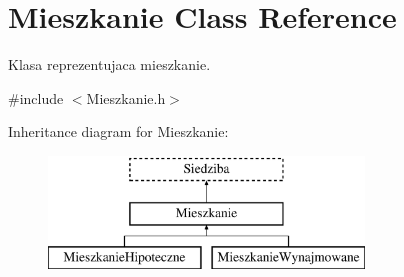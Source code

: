 \hypertarget{class_mieszkanie}{}\section{Mieszkanie Class Reference}
\label{class_mieszkanie}


Klasa reprezentujaca mieszkanie.  




{\ttfamily \#include $<$Mieszkanie.\+h$>$}

Inheritance diagram for Mieszkanie\+:\begin{figure}[H]
\begin{center}
\leavevmode
\includegraphics[height=3.000000cm]{class_mieszkanie}
\end{center}
\end{figure}
